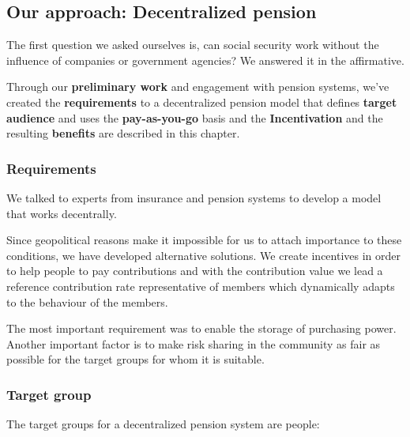 \subsection{Our approach: Decentralized pension}

The first question we asked ourselves is, can social security work without the influence of companies or government agencies? We answered it in the affirmative.

Through our \textbf{preliminary work} and engagement with pension systems, we've created the \textbf{requirements} to a decentralized pension model that defines \textbf{target audience} and uses the \textbf{pay-as-you-go} basis and the \textbf{ Incentivation} and the resulting \textbf{benefits} are described in this chapter.

\subsubsection{Requirements}
We talked to experts from insurance and pension systems to develop a model that works decentrally.

Since geopolitical reasons make it impossible for us to attach importance to these conditions, we have developed alternative solutions.
We create incentives in order to help people to pay contributions and with the contribution value we lead a reference contribution rate representative of members which dynamically adapts to the behaviour of the members.

The most important requirement was to enable the storage of purchasing power. Another important factor is to make risk sharing in the community as fair as possible for the target groups for whom it is suitable.

\subsubsection{Target group}
The target groups for a decentralized pension system are people:

